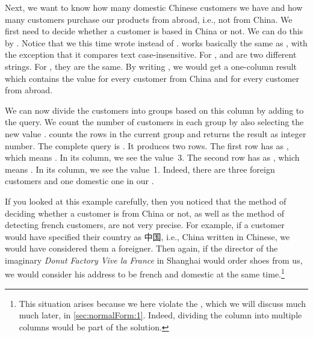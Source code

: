 Next, we want to know how many domestic Chinese customers we have and how many customers purchase our products from abroad, i.e., not from China.
We first need to decide whether a customer is based in China or not.
We can do this by .
Notice that we this time wrote  instead of .
 works basically the same as , with the exception that it compares text case-insensitive.
For ,  and  are two different strings.
For , they are the same.
By writing , we would get a one-column result which contains the value  for every customer from China and  for every customer from abroad.%
%
\begin{sloppypar}%
We can now divide the customers into groups based on this column  by adding  to the query.
We count the number of customers in each group by also selecting the new value .
 counts the rows in the current group and returns the result as integer number.
The complete query is .
It produces two rows.
The first row has  as , which means .
In its  column, we see the value~3.
The second row has  as , which means .
In its  column, we see the value~1.
Indeed, there are three foreign customers and one domestic one in our \db.%
\end{sloppypar}%
%
If you looked at this example carefully, then you noticed that the method of deciding whether a customer is from China or not, as well as the method of detecting french customers, are not very precise.
For example, if a customer would have specified their country as 中国, i.e., China written in Chinese, we would have considered them a foreigner.
Then again, if the director of the imaginary \emph{Donut Factory Vive la France} in Shanghai would order shoes from us, we would consider his address to be french and domestic at the same time.\footnote{%
This situation arises because we here violate the , which we will discuss much much later, in \cref{sec:normalForm:1}. %
Indeed, dividing the  column into multiple columns would be part of the solution.}
